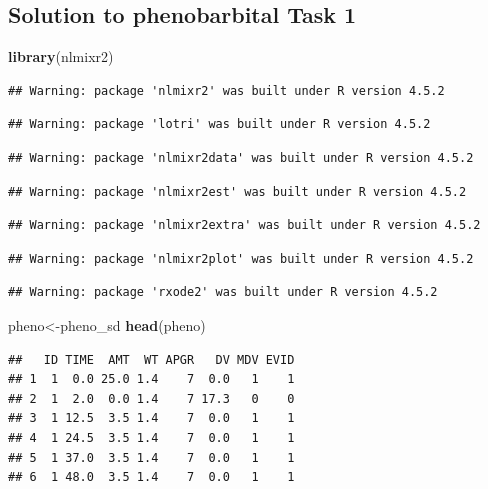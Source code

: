 \documentclass[
]{article}
\newenvironment{Shaded}{\begin{snugshade}}{\end{snugshade}}
\newcommand{\FunctionTok}[1]{\textcolor[rgb]{0.13,0.29,0.53}{\textbf{#1}}}
\newcommand{\NormalTok}[1]{#1}
\newcommand{\OtherTok}[1]{\textcolor[rgb]{0.56,0.35,0.01}{#1}}
\begin{document}
\newpage

\subsection{Solution to phenobarbital Task 1}\label{solution-to-phenobarbital-task-1}

\begin{Shaded}
\begin{Highlighting}[]
\FunctionTok{library}\NormalTok{(nlmixr2)}
\end{Highlighting}
\end{Shaded}

\begin{verbatim}
## Warning: package 'nlmixr2' was built under R version 4.5.2
\end{verbatim}

\begin{verbatim}
## Warning: package 'lotri' was built under R version 4.5.2
\end{verbatim}

\begin{verbatim}
## Warning: package 'nlmixr2data' was built under R version 4.5.2
\end{verbatim}

\begin{verbatim}
## Warning: package 'nlmixr2est' was built under R version 4.5.2
\end{verbatim}

\begin{verbatim}
## Warning: package 'nlmixr2extra' was built under R version 4.5.2
\end{verbatim}

\begin{verbatim}
## Warning: package 'nlmixr2plot' was built under R version 4.5.2
\end{verbatim}

\begin{verbatim}
## Warning: package 'rxode2' was built under R version 4.5.2
\end{verbatim}

\begin{Shaded}
\begin{Highlighting}[]
\NormalTok{pheno}\OtherTok{\textless{}{-}}\NormalTok{pheno\_sd}
\FunctionTok{head}\NormalTok{(pheno)}
\end{Highlighting}
\end{Shaded}

\begin{verbatim}
##   ID TIME  AMT  WT APGR   DV MDV EVID
## 1  1  0.0 25.0 1.4    7  0.0   1    1
## 2  1  2.0  0.0 1.4    7 17.3   0    0
## 3  1 12.5  3.5 1.4    7  0.0   1    1
## 4  1 24.5  3.5 1.4    7  0.0   1    1
## 5  1 37.0  3.5 1.4    7  0.0   1    1
## 6  1 48.0  3.5 1.4    7  0.0   1    1
\end{verbatim}
\end{document}
